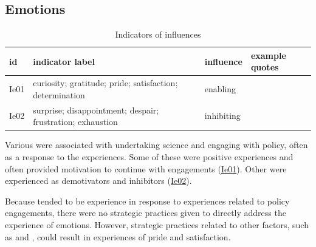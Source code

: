 \subsection{Emotions}\label{sec:resemotions}

\begin{table}[!ht]
\footnotesize
\caption{Indicators of \skiemot{} influences}\label{tab:resemot}
\begin{tabular}{L{.07\linewidth}L{.3\linewidth}L{.11\linewidth}L{.52\linewidth}} \hline
\textbf{id} & \textbf{indicator label} & \textbf{influence} & \textbf{example quotes} \\ \hline \hline 
Ie01 & curiosity; gratitude; pride; satisfaction; determination & enabling &  \vfill {} \\ 
Ie02 & surprise; disappointment; despair; frustration; exhaustion & inhibiting &  \vfill {} \\ \hline
\end{tabular}
\end{table}

Various \ismie{} were associated with undertaking science and engaging with policy, often as a response to the experiences. Some of these were positive experiences and often provided motivation to continue with engagements (\hyperref[tab:resemot]{Ie01}). Other were experienced as demotivators and inhibitors (\hyperref[tab:resemot]{Ie02}).

Because \ismie{} tended to be experience in response to experiences related to policy engagements, there were no strategic practices given to directly address the experience of emotions. However, strategic practices related to other factors, such as \skipers{} and \skiskil, could result in experiences of pride and satisfaction.

\subsection{\titagen}\label{sec:resskiagen}

